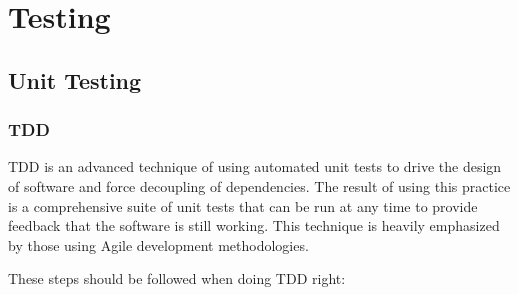 \chapter{Testing}\label{cha:testing}

	\section{Unit Testing}

	\subsection{\gls{TDD}}
	
	\cite{msdntdd}
	TDD is an advanced technique of using automated unit tests to drive the design of software
	and force decoupling of dependencies. The result of using this practice is a comprehensive suite of unit tests that can
	be run at any time to provide feedback that the software is still working. This technique is heavily emphasized by
	those using Agile development methodologies.
	
	These steps should be followed when doing TDD right:
	
